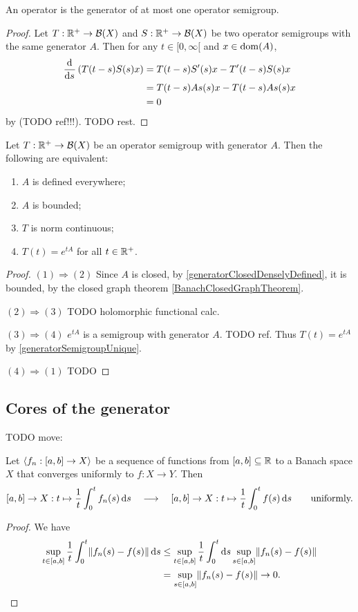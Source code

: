 \begin{proposition} \label{generatorSemigroupUnique}
An operator is the generator of at most one operator semigroup.
\end{proposition}
\begin{proof}
Let $T: \mathbb{R}^+\to \operatorname{\mathcal{B}}(X)$ and $S: \mathbb{R}^+\to \operatorname{\mathcal{B}}(X)$ be two operator semigroups with the same generator $A$. Then for any $t\in [0,\infty[$ and $x\in \operatorname{dom}(A)$,
\begin{align*}
\mathinner{ \dfrac{\operatorname{d \!}{^{}}}{\operatorname{d \!}{{s}^{}}} } \left(T(t-s)S(s)x\right) &= T(t-s)S'(s)x - T'(t-s)S(s)x \\
&= T(t-s)As(s)x - T(t-s)As(s)x \\
&= 0
\end{align*}
by (TODO ref!!!). TODO rest.
\end{proof}

\begin{proposition} \label{boundedGenerator}
Let $T: \mathbb{R}^+\to \operatorname{\mathcal{B}}(X)$ be an operator semigroup with generator $A$. Then the following are equivalent:
\begin{enumerate}
\item $A$ is defined everywhere;
\item $A$ is bounded;
\item $T$ is norm continuous;
\item $T(t) = e^{tA}$ for all $t\in\mathbb{R} ^+$.
\end{enumerate}
\end{proposition}
\begin{proof}
$(1) \Rightarrow (2)$ Since $A$ is closed, by \ref{generatorClosedDenselyDefined}, it is bounded, by the closed graph theorem \ref{BanachClosedGraphTheorem}.

$(2) \Rightarrow (3)$ TODO holomorphic functional calc.

$(3) \Rightarrow (4)$ $e^{tA}$ is a semigroup with generator $A$. TODO ref. Thus $T(t) = e^{tA}$ by \ref{generatorSemigroupUnique}.

$(4) \Rightarrow (1)$ TODO
\end{proof}

\subsection{Cores of the generator}
TODO move:
\begin{lemma} \label{uniformContinuityAverage}
Let $\left\langle f_n: [a,b]\to X \right\rangle$ be a sequence of functions from $[a,b]\subseteq \mathbb{R}$ to a Banach space $X$ that converges uniformly to $f: X\to Y$. Then
\[ [a,b]\to X: t\mapsto \frac{1}{t}\int_{0}^tf_n(s)\operatorname{d \!}{s} \quad\longrightarrow\quad [a,b]\to X: t\mapsto \frac{1}{t}\int_{0}^tf(s)\operatorname{d \!}{s} \qquad \text{uniformly.} \]
\end{lemma}
\begin{proof}
We have
\begin{align*}
\sup_{t\in[a,b]}\frac{1}{t}\int_0^t \lVert f_n(s) - f(s)\rVert\operatorname{d \!}{s} &\leq \sup_{t\in[a,b]}\frac{1}{t}\int_0^t \operatorname{d \!}{s}\sup_{s\in [a,b]} \lVert f_n(s) - f(s)\rVert \\
&= \sup_{s\in [a,b]} \lVert f_n(s) - f(s)\rVert \to 0.
\end{align*}
\end{proof}

